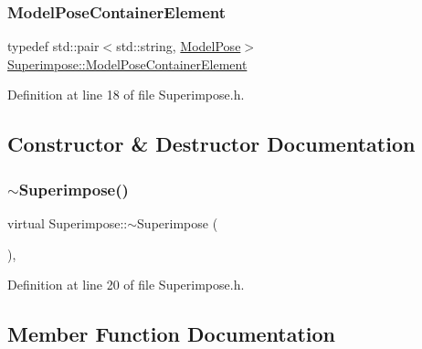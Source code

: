 \subsubsection{\texorpdfstring{Model\+Pose\+Container\+Element}{ModelPoseContainerElement}}
{\footnotesize\ttfamily typedef std\+::pair$<$std\+::string, \mbox{\hyperlink{classSuperimpose_a85d40a5caf19f486d1e0c15c0a025378}{Model\+Pose}}$>$ \mbox{\hyperlink{classSuperimpose_a1e02e0225687b42296dcfee4eadf8a55}{Superimpose\+::\+Model\+Pose\+Container\+Element}}}



Definition at line 18 of file Superimpose.\+h.



\subsection{Constructor \& Destructor Documentation}
\mbox{\label{classSuperimpose_a9e32031994dc105b1572e7a6db26b41b}} 
\subsubsection{\texorpdfstring{$\sim$\+Superimpose()}{~Superimpose()}}
{\footnotesize\ttfamily virtual Superimpose\+::$\sim$\+Superimpose (\begin{DoxyParamCaption}{ }\end{DoxyParamCaption})\hspace{0.3cm}{\ttfamily [inline]}, {\ttfamily [virtual]}}



Definition at line 20 of file Superimpose.\+h.



\subsection{Member Function Documentation}
\mbox{\label{classSuperimpose_a62c4c269b8fc34cc36d3d54fa4acb35c}} 
